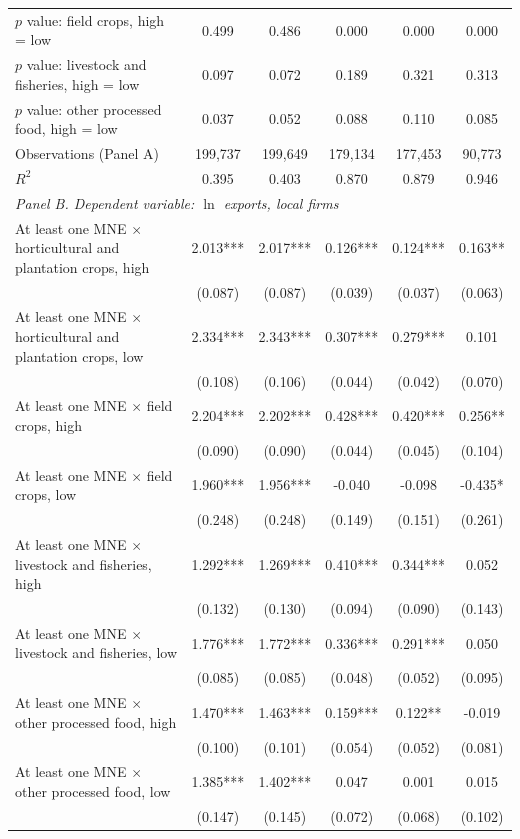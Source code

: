 \begin{tabular}{l*{5}{c}}
$p$ value: field crops, high = low & 0.499 & 0.486 & 0.000 & 0.000 & 0.000 \\
$p$ value: livestock and fisheries, high = low & 0.097 & 0.072 & 0.189 & 0.321 & 0.313 \\
$p$ value: other processed food, high = low & 0.037 & 0.052 & 0.088 & 0.110 & 0.085 \\
Observations (Panel A) & 199,737 & 199,649 & 179,134 & 177,453 & 90,773 \\
$R^2$ & 0.395 & 0.403 & 0.870 & 0.879 & 0.946 \\
\midrule
\multicolumn{6}{l}{\textit{Panel B. Dependent variable: $\ln$ exports, local firms}} \\
At least one MNE $\times$ horticultural and plantation crops, high & 2.013*** & 2.017*** & 0.126*** & 0.124*** & 0.163** \\
 & (0.087) & (0.087) & (0.039) & (0.037) & (0.063) \\
At least one MNE $\times$ horticultural and plantation crops, low & 2.334*** & 2.343*** & 0.307*** & 0.279*** & 0.101 \\
 & (0.108) & (0.106) & (0.044) & (0.042) & (0.070) \\
At least one MNE $\times$ field crops, high & 2.204*** & 2.202*** & 0.428*** & 0.420*** & 0.256** \\
 & (0.090) & (0.090) & (0.044) & (0.045) & (0.104) \\
At least one MNE $\times$ field crops, low & 1.960*** & 1.956*** & -0.040 & -0.098 & -0.435* \\
 & (0.248) & (0.248) & (0.149) & (0.151) & (0.261) \\
At least one MNE $\times$ livestock and fisheries, high & 1.292*** & 1.269*** & 0.410*** & 0.344*** & 0.052 \\
 & (0.132) & (0.130) & (0.094) & (0.090) & (0.143) \\
At least one MNE $\times$ livestock and fisheries, low & 1.776*** & 1.772*** & 0.336*** & 0.291*** & 0.050 \\
 & (0.085) & (0.085) & (0.048) & (0.052) & (0.095) \\
At least one MNE $\times$ other processed food, high & 1.470*** & 1.463*** & 0.159*** & 0.122** & -0.019 \\
 & (0.100) & (0.101) & (0.054) & (0.052) & (0.081) \\
At least one MNE $\times$ other processed food, low & 1.385*** & 1.402*** & 0.047 & 0.001 & 0.015 \\
 & (0.147) & (0.145) & (0.072) & (0.068) & (0.102) \\

\end{tabular}
